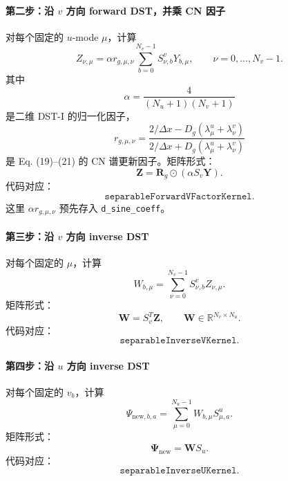 \documentclass[11pt,a4paper]{ctexart}
\begin{document}
\paragraph{第二步：沿 \(v\) 方向 forward DST，并乘 CN 因子}
对每个固定的 \(u\)-mode \(\mu\)，计算
\begin{equation}
  Z_{\nu,\mu}
  =
  \alpha r_{g,\mu,\nu}
  \sum_{b=0}^{N_v-1}
  S^v_{\nu,b}Y_{b,\mu},
  \qquad
  \nu=0,\ldots,N_v-1.
\end{equation}
其中
\begin{equation}
  \alpha=\frac{4}{(N_u+1)(N_v+1)}
\end{equation}
是二维 DST-I 的归一化因子，
\begin{equation}
  r_{g,\mu,\nu}
  =
  \frac{2/\Delta x-D_g(\lambda^u_\mu+\lambda^v_\nu)}
       {2/\Delta x+D_g(\lambda^u_\mu+\lambda^v_\nu)}
\end{equation}
是 Eq. (19)--(21) 的 CN 谱更新因子。矩阵形式：
\begin{equation}
  \mathbf Z
  =
  \mathbf R_g
  \odot
  \left(
    \alpha S_v\mathbf Y
  \right).
\end{equation}
代码对应：
\begin{equation}
  \texttt{separableForwardVFactorKernel}.
\end{equation}
这里 \(\alpha r_{g,\mu,\nu}\) 预先存入 \texttt{d\_sine\_coeff}。

\paragraph{第三步：沿 \(v\) 方向 inverse DST}
对每个固定的 \(\mu\)，计算
\begin{equation}
  W_{b,\mu}
  =
  \sum_{\nu=0}^{N_v-1}
  S^v_{\nu,b} Z_{\nu,\mu}.
\end{equation}
矩阵形式：
\begin{equation}
  \mathbf W
  =
  S_v^T\mathbf Z,
  \qquad
  \mathbf W\in\mathbb R^{N_v\times N_u}.
\end{equation}
代码对应：
\begin{equation}
  \texttt{separableInverseVKernel}.
\end{equation}

\paragraph{第四步：沿 \(u\) 方向 inverse DST}
对每个固定的 \(v_b\)，计算
\begin{equation}
  \Psi_{\mathrm{new},b,a}
  =
  \sum_{\mu=0}^{N_u-1}
  W_{b,\mu}S^u_{\mu,a}.
\end{equation}
矩阵形式：
\begin{equation}
  \mathbf\Psi_{\mathrm{new}}
  =
  \mathbf W S_u.
\end{equation}
代码对应：
\begin{equation}
  \texttt{separableInverseUKernel}.
\end{equation}
\end{document}
